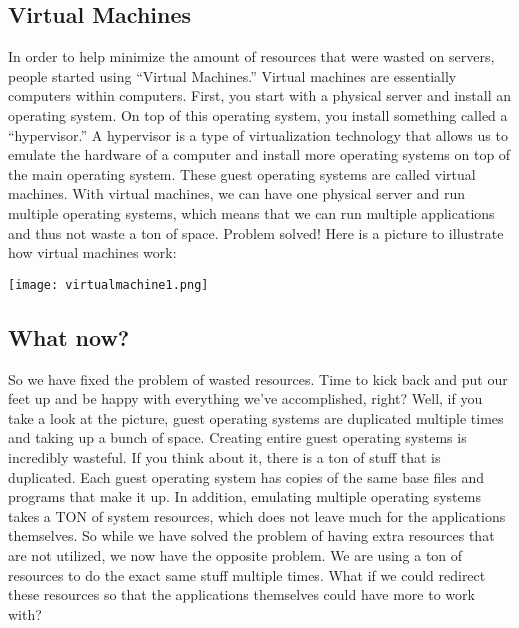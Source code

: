 \subsection{Virtual Machines}
In order to help minimize the amount of resources that were wasted on servers, people started using ``Virtual Machines.'' Virtual machines are essentially computers within computers. First, you start with a physical server and install an operating system. On top of this operating system, you install something called a ``hypervisor.'' A hypervisor is a type of virtualization technology that allows us to emulate the hardware of a computer and install more operating systems on top of the main operating system. These guest operating systems are called virtual machines. With virtual machines, we can have one physical server and run multiple operating systems, which means that we can run multiple applications and thus not waste a ton of space. Problem solved! Here is a picture to illustrate how virtual machines work:
\begin{center}
    \texttt{[image: virtualmachine1.png]}
\end{center}

\subsection{What now?}
So we have fixed the problem of wasted resources. Time to kick back and put our feet up and be happy with everything we’ve accomplished, right? Well, if you take a look at the picture, guest operating systems are duplicated multiple times and taking up a bunch of space. Creating entire guest operating systems is incredibly wasteful. If you think about it, there is a ton of stuff that is duplicated. Each guest operating system has copies of the same base files and programs that make it up. In addition, emulating multiple operating systems takes a TON of system resources, which does not leave much for the applications themselves. So while we have solved the problem of having extra resources that are not utilized, we now have the opposite problem. We are using a ton of resources to do the exact same stuff multiple times. What if we could redirect these resources so that the applications themselves could have more to work with?


